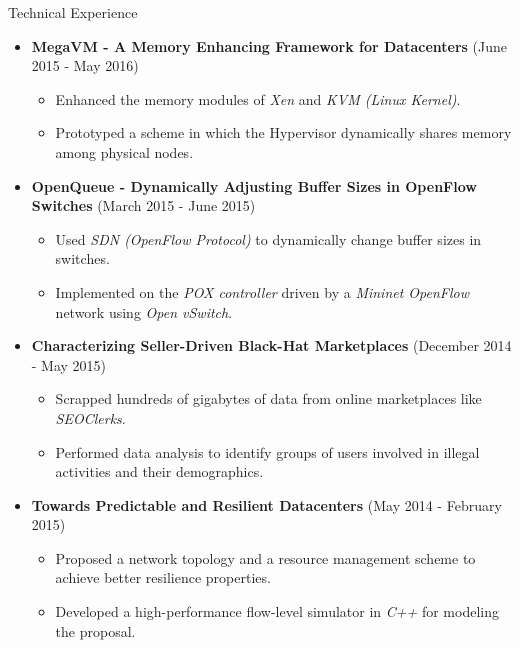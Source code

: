 \documentclass[]{Gohar_CV_Jobs}
\begin{document}
    \begin{cvsection}{Technical Experience}
        \begin{cvsubsection}{}{}{}
            \begin{itemize}
                \item \textbf{MegaVM - A Memory Enhancing Framework for Datacenters} (June 2015 - May 2016) 
                    \begin{itemize}
                        \item Enhanced the memory modules of \textit{Xen} and \textit{KVM (Linux Kernel)}. 
                        \item Prototyped a scheme in which the Hypervisor dynamically shares memory among physical nodes.
                    \end{itemize}
                \item \textbf{OpenQueue - Dynamically Adjusting Buffer Sizes in OpenFlow Switches} (March 2015 - June 2015) 
                    \begin{itemize}
                        \item Used \textit{SDN (OpenFlow  Protocol)} to dynamically change buffer sizes in switches. 
                        \item Implemented on the \textit{POX controller} driven by a \textit{Mininet OpenFlow} network using \textit{Open vSwitch}.
                    \end{itemize}
                \item \textbf{Characterizing Seller-Driven Black-Hat Marketplaces} (December 2014 - May 2015) 
                    \begin{itemize}
                        \item Scrapped hundreds of gigabytes of data from online marketplaces like \textit{SEOClerks}.
                        \item Performed data analysis to identify groups of users involved in illegal activities and their demographics.
                    \end{itemize}
                \item \textbf{Towards Predictable and Resilient Datacenters} (May 2014 - February 2015) 
                    \begin{itemize}
                        \item Proposed a network topology and a resource management scheme to achieve better resilience properties. 
                        \item Developed a high-performance flow-level simulator in \textit{C++} for modeling the proposal.
                    \end{itemize}
            \end{itemize}
        \end{cvsubsection}
    \end{cvsection}
    
\end{document}
